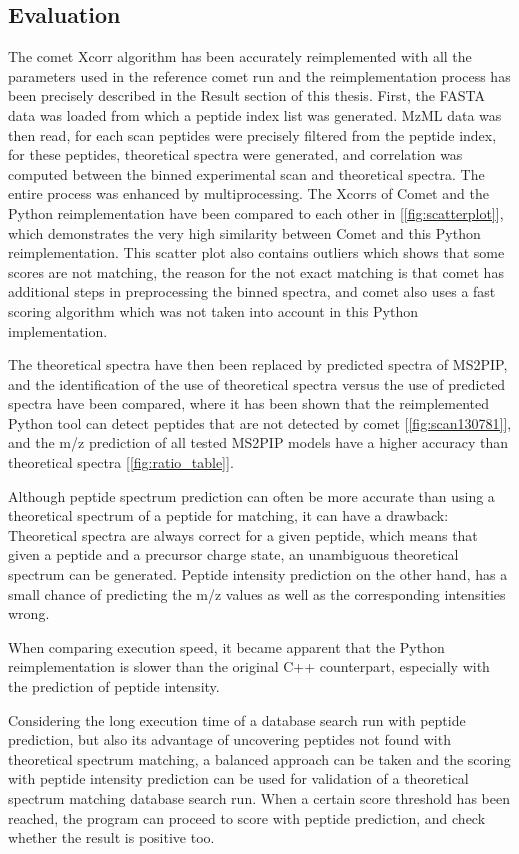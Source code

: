 \documentclass[11pt]{article}
\begin{document}
\subsection{Evaluation}
The comet Xcorr algorithm has been accurately reimplemented with all the parameters used in the reference comet run and the reimplementation process has been precisely described in the Result section of this thesis. First, the FASTA data was loaded from which a peptide index list was generated. MzML data was then read, for each scan peptides were precisely filtered from the peptide index, for these peptides, theoretical spectra were generated, and correlation was computed between the binned experimental scan and theoretical spectra. The entire process was enhanced by multiprocessing. The Xcorrs of Comet and the Python reimplementation have been compared to each other in [\cref{fig:scatterplot}], which demonstrates the very high similarity between Comet and this Python reimplementation. This scatter plot also contains outliers which shows that some scores are not matching, the reason for the not exact matching is that comet has additional steps in preprocessing the binned spectra, and comet also uses a fast scoring algorithm which was not taken into account in this Python implementation. 

The theoretical spectra have then been replaced by predicted spectra of MS2PIP, and the identification of the use of theoretical spectra versus the use of predicted spectra have been compared, where it has been shown that the reimplemented Python tool can detect peptides that are not detected by comet [\cref{fig:scan130781}], and the m/z prediction of all tested MS2PIP models have a higher accuracy than theoretical spectra [\cref{fig:ratio_table}].

Although peptide spectrum prediction can often be more accurate than using a theoretical spectrum of a peptide for matching,
it can have a drawback: Theoretical spectra are always correct for a given peptide, which means that given a peptide and a precursor charge state, an unambiguous theoretical spectrum can be generated. Peptide intensity prediction on the other hand, has a small chance of predicting the m/z values as well as the corresponding intensities wrong.

When comparing execution speed, it became apparent that the Python reimplementation is slower than the original C++ counterpart, especially with the prediction of peptide intensity. 

Considering the long execution time of a database search run with peptide prediction, but also its advantage of uncovering peptides not found with theoretical spectrum matching, a balanced approach can be taken and the scoring with peptide intensity prediction can be used for validation of a theoretical spectrum matching database search run. When a certain score threshold has been reached, the program can proceed to score with peptide prediction, and check whether the result is positive too.
\end{document}
